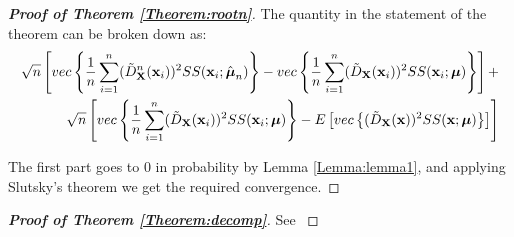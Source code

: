 \documentclass[fleqn,11pt]{article}
\begin{document}
\begin{proof}[\textbf{Proof of Theorem \ref{Theorem:rootn}}]
The quantity in the statement of the theorem can be broken down as:
\begin{eqnarray*}
\sqrt n \left[ vec\left\{ \frac{1}{n} \sum_{i=1}^n (\tilde D^n_{\mathbf{X}} ({\bf{x}}_i))^2 SS({\bf{x}}_i; \hat{{\boldsymbol{\mu}}}_n) \right\} - vec\left\{ \frac{1}{n} \sum_{i=1}^n (\tilde D_{\mathbf{X}} ({\bf{x}}_i))^2 SS({\bf{x}}_i; {\boldsymbol{\mu}}) \right\} \right] +\\
\sqrt n \left[ vec\left\{ \frac{1}{n} \sum_{i=1}^n (\tilde D_{\mathbf{X}} ({\bf{x}}_i))^2 SS({\bf{x}}_i; {\boldsymbol{\mu}}) \right\} - E \left[ vec\left\{ (\tilde D_{\mathbf{X}} ({\bf{x}}))^2 SS({\bf{x}}; {\boldsymbol{\mu}}) \right\} \right] \right]
\end{eqnarray*}

The first part goes to 0 in probability by Lemma \ref{Lemma:lemma1}, and applying Slutsky's theorem we get the required convergence.
\end{proof}

\begin{proof}[\textbf{Proof of Theorem \ref{Theorem:decomp}}]
See \cite{taskinen12}
\end{proof}
\end{document}
